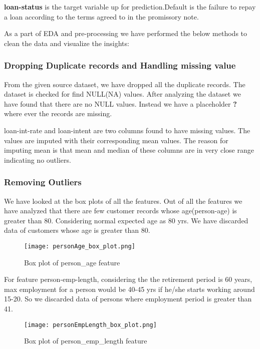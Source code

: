 \documentclass[12pt]{article}
\begin{document}
\textbf{loan-status} is the target variable up for prediction.Default is the failure to repay a loan according to the terms agreed to in the promissory note.

As a part of EDA and pre-processing we have performed the below methods to clean the data and visualize the insights:

\subsubsection{Dropping Duplicate records and Handling missing value}
From the given source dataset, we have dropped all the duplicate records. The dataset is checked for find NULL(NA) values. After analyzing the dataset we have found that there are no NULL values. Instead we have a placeholder \textbf{?} where ever the records are missing.

loan-int-rate and loan-intent are two columns found to have missing values.  The values are imputed with their corresponding mean values. The reason for imputing mean is that mean and median of these columns are in very close range indicating no outliers.

\subsubsection{Removing Outliers}We have looked at the box plots of all the features. Out of all the features we have analyzed that there are few customer records whose age(person-age) is greater than 80. Considering normal expected age as 80 yrs. We have discarded data of customers whose age is greater than 80.

\begin{figure}[h] %
\centering
\texttt{[image: personAge\_box\_plot.png]}
\caption{Box plot of person\_age feature}
\end{figure}

For feature person-emp-length, considering the the retirement period is 60 years, max employment for a person would be 40-45 yrs if he/she starts working around 15-20. So we discarded data of persons where employment period is greater than 41.

\begin{figure}[h] %
\centering
\texttt{[image: personEmpLength\_box\_plot.png]}
\caption{Box plot of person\_emp\_length feature}
\end{figure}
\end{document}
